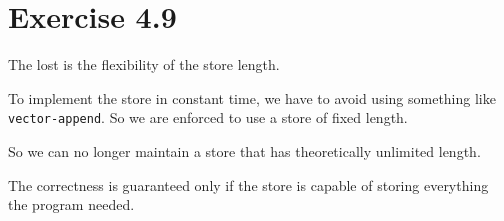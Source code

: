 \section*{Exercise 4.9}

The lost is the flexibility of the store length.

To implement the store in constant time, we have to avoid
using something like \texttt{vector-append}.
So we are enforced
to use a store of fixed length.

So we can no longer maintain a store that has theoretically unlimited length. 

The correctness is guaranteed only if the store is capable of storing everything
the program needed.

